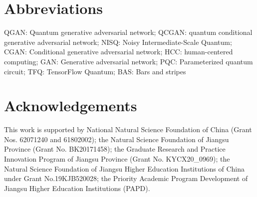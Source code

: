 \documentclass{bmcart}
\begin{document}
\begin{backmatter}
\section*{Abbreviations}
QGAN: Quantum generative adversarial network; QCGAN: quantum conditional generative adversarial network; NISQ: Noisy Intermediate-Scale Quantum; CGAN: Conditional generative adversarial network; HCC: human-centered computing; GAN: Generative adversarial network; PQC: Parameterized quantum circuit; TFQ: TensorFlow Quantum; BAS: Bars and stripes


\section*{Acknowledgements}
This work is supported by National Natural Science Foundation of China (Grant Nos. 62071240 and 61802002); the Natural Science Foundation of Jiangsu Province (Grant No. BK20171458); the Graduate Research and Practice Innovation Program of Jiangsu Province (Grant No. KYCX20\_0969); the Natural Science Foundation of Jiangsu Higher Education Institutions of China under Grant No.19KJB520028; the Priority Academic Program Development of Jiangsu Higher Education Institutions (PAPD).







\end{backmatter}
\end{document}
